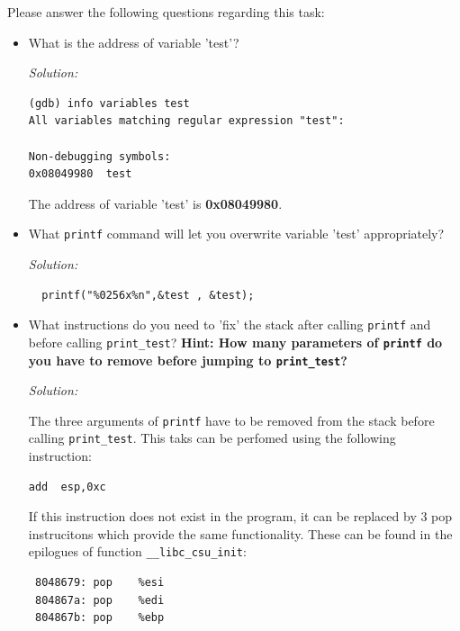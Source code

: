 \documentclass[a4paper,11pt]{article}
\newenvironment{solution}%
{\par{\noindent\small\textit{Solution:}}\vspace{-12pt}\begin{framed}}%
{\end{framed}\par}
\begin{document}
\noindent Please answer the following questions regarding this task:

\begin{itemize}
\item What is the address of variable 'test'?
\ifsolution\begin{solution}

\begin{lstlisting}
(gdb) info variables test
All variables matching regular expression "test":

Non-debugging symbols:
0x08049980  test
\end{lstlisting}

The address of variable 'test' is \textbf{0x08049980}.
\end{solution}\fi
\item What \texttt{printf} command will let you overwrite variable 'test'
  appropriately?
\ifsolution\begin{solution}
\begin{lstlisting}
  printf("%0256x%n",&test , &test);
\end{lstlisting}
\end{solution}\fi
\item What instructions do you need to 'fix' the stack after calling
  \texttt{printf} and before calling \texttt{print\_test}? \textbf{Hint: How
    many parameters of \texttt{printf} do you have to remove before jumping to \texttt{print\_test}?}
\ifsolution\begin{solution}
The three arguments of \texttt{printf} have to be removed from the stack before calling \texttt{print\_test}. This taks 
can be perfomed using the following instruction:
\begin{lstlisting}
add  esp,0xc
\end{lstlisting}
If this instruction does not exist in the program, it can be replaced by 3 pop instrucitons which provide the same functionality. 
These can be found in the  epilogues of function \texttt{\_\_libc\_csu\_init}:
\begin{lstlisting}
 8048679: pop    %esi
 804867a: pop    %edi
 804867b: pop    %ebp
 \end{lstlisting} 


\end{solution}
\end{itemize}
\end{document}
